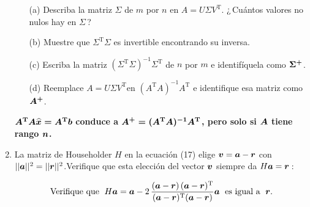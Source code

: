 \documentclass[12pt,a4paper]{article}
\newcommand{\bi}[1]{\hbox{\boldmath$#1$}}
\newcommand\1{\mbox{\,\vrule height-0.8pt depth1.0pt width2pc\,}}
\newcommand\2{\mbox{\,\vrule height-0.8pt depth1.0pt width1pc\,}}
\DeclareRobustCommand\transp{^{\mathrm{T}}}
\newcommand{\bv}{\hbox{\boldmath$v$}}
\begin{document}
\begin{enumerate}
\vspace{-5pt}
\begin{itemize}
\item [(a)] Describa la matriz $\Sigma$ de $m$ por $n$ en $A=U\Sigma V\transp$.  ¿\,Cuántos valores no nulos hay en $\Sigma$\,?
\item [(b)] Muestre que $\Sigma\transp\Sigma$ es invertible encontrando su inversa.
\item [(c)] Escriba la matriz  $(\Sigma\transp\Sigma)^{-1}\Sigma\transp$ de $n$ por $m$ e identifíquela como $\bi{\Sigma^+}$.
\item [(d)] Reemplace $A=U\Sigma V\transp$en $(A\transp A)^{-1}A\transp$ e identifique esa matriz como $\bi{A^+}$.
\end{itemize}

\vspace{-4pt}
$\bi{A\transp A\bi{\widehat{x}}=A\transp\bi{b}}$ \textbf{\;conduce a\; $\bi{A^+=(A\transp A)^{-1}A\transp}$, pero solo si $\bi{A}$ tiene rango $\bi{n}$.}
\item La matriz de Householder  $H$ en la ecuación (17) elige $\bv=\bi{a}-\bi{r}$ con $||\bi{a}||^2=||\bi{r}||^2$.\linebreak Verifique que esta elección del vector $\bv$ siempre da $H\bi{a}=\bi{r}$\,:

\vspace{-5pt}
$$
\text{Verifique que\; } H\bi{a} = \bi{a}-2\,\dfrac{(\bi{a}-\bi{r})\,(\bi{a}-\bi{r})\transp}{(\bi{a}-\bi{r})\transp (\bi{a}-\bi{r})}\bi{a}\text{ \;es igual a\; }\bi{r}.
$$


\end{enumerate}
\end{document}

